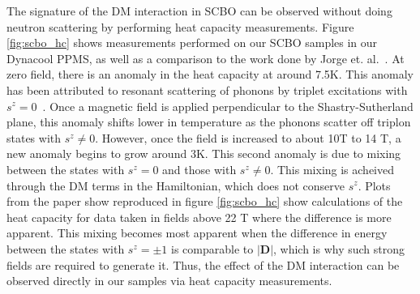\documentclass{thesis-umich}
\begin{document}
The signature of the DM interaction in SCBO can be observed without doing neutron scattering by performing heat capacity measurements. Figure \ref{fig:scbo_hc} shows measurements performed on our SCBO samples in our Dynacool PPMS, as well as a comparison to the work done by Jorge et. al.~\cite{Jorge2005}. At zero field, there is an anomaly in the heat capacity at around 7.5K. This anomaly has been attributed to resonant scattering of phonons by triplet excitations with $s^z = 0$~\cite{Hofmann2001}. Once a magnetic field is applied perpendicular to the Shastry-Sutherland plane, this anomaly shifts lower in temperature as the phonons scatter off triplon states with $s^z \neq 0$. However, once the field is increased to about 10T to 14 T, a new anomaly begins to grow around 3K. This second anomaly is due to mixing between the states with $s^z = 0$ and those with $s^z \neq 0$. This mixing is acheived through the DM terms in the Hamiltonian, which does not conserve $s^z$. Plots from the paper show reproduced in figure \ref{fig:scbo_hc} show calculations of the heat capacity for data taken in fields above 22 T where the difference is more apparent. This mixing becomes most apparent when the difference in energy between the states with $s^z = \pm 1$ is comparable to $|\mathbf{D}|$, which is why such strong fields are required to generate it. Thus, the effect of the DM interaction can be observed directly in our samples via heat capacity measurements.
\end{document}
